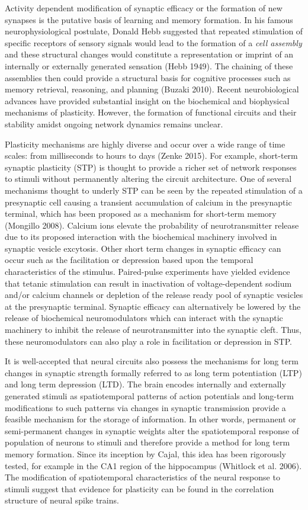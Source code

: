 \documentclass{ucetd}
\begin{document}
Activity dependent modification of synaptic efficacy or the formation of new synapses is the putative basis of learning and memory formation. In his famous neurophysiological postulate, Donald Hebb suggested that repeated stimulation of specific receptors of sensory signals would lead to the formation of a \emph{cell assembly} and these structural changes would constitute a representation or imprint of an internally or externally generated sensation (Hebb 1949). The chaining of these assemblies then could provide a structural basis for cognitive processes such as memory retrieval, reasoning, and planning (Buzaki 2010). Recent neurobiological advances have provided substantial insight on the biochemical and biophysical mechanisms of plasticity. However, the formation of functional circuits and their stability amidst ongoing network dynamics remains unclear.

Plasticity mechanisms are highly diverse and occur over a wide range of time scales: from milliseconds to hours to days (Zenke 2015). For example, short-term synaptic plasticity (STP) is thought to provide a richer set of network responses to stimuli without permanently altering the circuit architecture. One of several mechanisms thought to underly STP can be seen by the repeated stimulation of a presynaptic cell causing a transient accumulation of calcium in the presynaptic terminal, which has been proposed as a mechanism for short-term memory (Mongillo 2008). Calcium ions elevate the probability of neurotransmitter release due to its proposed interaction with the biochemical machinery involved in synaptic vesicle excytosis. Other short term changes in synaptic efficacy can occur such as the facilitation or depression based upon the temporal characteristics of the stimulus. Paired-pulse experiments have yielded evidence that tetanic stimulation can result in inactivation of voltage-dependent sodium and/or calcium channels or depletion of the release ready pool of synaptic vesicles at the presynaptic terminal. Synaptic efficacy can alternatively be lowered by the release of biochemical neuromodulators which can interact with the synaptic machinery to inhibit the release of neurotransmitter into the synaptic cleft. Thus, these neuromodulators can also play a role in facilitation or depression in STP.

It is well-accepted that neural circuits also possess the mechanisms for long term changes in synaptic strength formally referred to as long term potentiation (LTP) and long term depression (LTD). The brain encodes internally and externally generated stimuli as spatiotemporal patterns of action potentials and long-term modifications to such patterns via changes in synaptic transmission provide a feasible mechanism for the storage of information. In other words, permanent or semi-permanent changes in synaptic weights alter the spatiotemporal response of population of neurons to stimuli and therefore provide a method for long term memory formation. Since its inception by Cajal, this idea has been rigorously tested, for example in the CA1 region of the hippocampus (Whitlock et al. 2006). The modification of spatiotemporal characteristics of the neural response to stimuli suggest that evidence for plasticity can be found in the correlation structure of neural spike trains.
\end{document}
